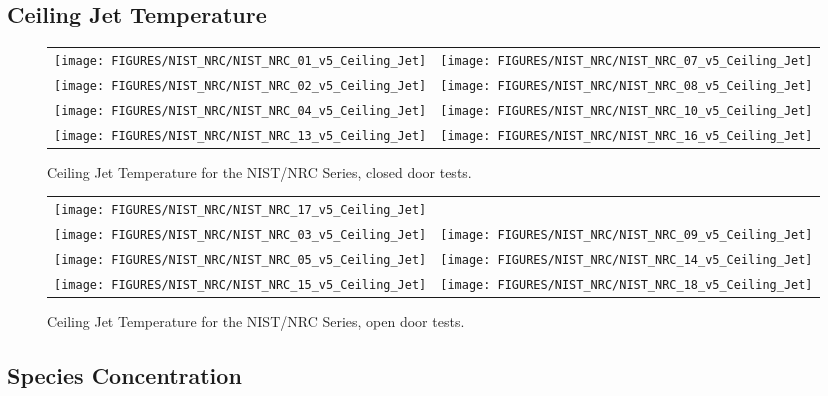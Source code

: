 \clearpage

\subsection{Ceiling Jet Temperature}

\begin{figure}[p]
\begin{tabular*}{\textwidth}{l@{\extracolsep{\fill}}r}
\texttt{[image: FIGURES/NIST\_NRC/NIST\_NRC\_01\_v5\_Ceiling\_Jet]} &
\texttt{[image: FIGURES/NIST\_NRC/NIST\_NRC\_07\_v5\_Ceiling\_Jet]} \\
\texttt{[image: FIGURES/NIST\_NRC/NIST\_NRC\_02\_v5\_Ceiling\_Jet]} &
\texttt{[image: FIGURES/NIST\_NRC/NIST\_NRC\_08\_v5\_Ceiling\_Jet]} \\
\texttt{[image: FIGURES/NIST\_NRC/NIST\_NRC\_04\_v5\_Ceiling\_Jet]} &
\texttt{[image: FIGURES/NIST\_NRC/NIST\_NRC\_10\_v5\_Ceiling\_Jet]} \\
\texttt{[image: FIGURES/NIST\_NRC/NIST\_NRC\_13\_v5\_Ceiling\_Jet]} &
\texttt{[image: FIGURES/NIST\_NRC/NIST\_NRC\_16\_v5\_Ceiling\_Jet]}
\end{tabular*}
\caption{Ceiling Jet Temperature for the NIST/NRC Series, closed door tests.}
\label{NIST_NRC_Jet_Closed}
\end{figure}

\begin{figure}[p]
\begin{tabular*}{\textwidth}{l@{\extracolsep{\fill}}r}
\texttt{[image: FIGURES/NIST\_NRC/NIST\_NRC\_17\_v5\_Ceiling\_Jet]} &
 \\
\texttt{[image: FIGURES/NIST\_NRC/NIST\_NRC\_03\_v5\_Ceiling\_Jet]} &
\texttt{[image: FIGURES/NIST\_NRC/NIST\_NRC\_09\_v5\_Ceiling\_Jet]} \\
\texttt{[image: FIGURES/NIST\_NRC/NIST\_NRC\_05\_v5\_Ceiling\_Jet]} &
\texttt{[image: FIGURES/NIST\_NRC/NIST\_NRC\_14\_v5\_Ceiling\_Jet]} \\
\texttt{[image: FIGURES/NIST\_NRC/NIST\_NRC\_15\_v5\_Ceiling\_Jet]} &
\texttt{[image: FIGURES/NIST\_NRC/NIST\_NRC\_18\_v5\_Ceiling\_Jet]}
\end{tabular*}
\caption{Ceiling Jet Temperature for the NIST/NRC Series, open door tests.}
\label{NIST_NRC_Jet_Open}
\end{figure}

\clearpage

\subsection{Species Concentration}

